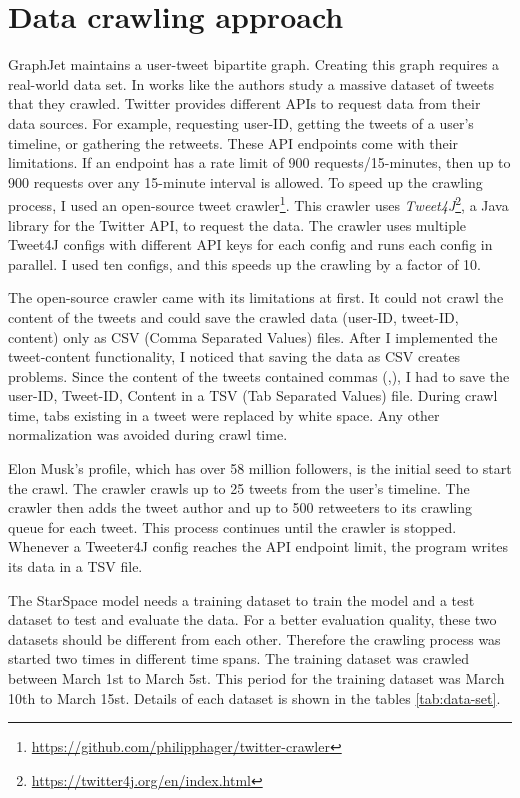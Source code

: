 \section{Data crawling approach}
\label{sec:data-crawling-approach}

GraphJet maintains a user-tweet bipartite graph. Creating this graph requires a real-world data set. In works like \cite{kwakWhatTwitterSocial2010} the authors study a massive dataset of tweets that they crawled. Twitter provides different APIs to request data from their data sources. For example, requesting user-ID, getting the tweets of a user's timeline, or gathering the retweets. These API endpoints come with their limitations. If an endpoint has a rate limit of 900 requests/15-minutes, then up to 900 requests over any 15-minute interval is allowed. To speed up the crawling process, I used an open-source tweet crawler\footnote{\url{https://github.com/philipphager/twitter-crawler}}. This crawler uses \emph{Tweet4J}\footnote{\url{https://twitter4j.org/en/index.html}}, a Java library for the Twitter API, to request the data. The crawler uses multiple Tweet4J configs with different API keys for each config and runs each config in parallel. I used ten configs, and this speeds up the crawling by a factor of 10. 


The open-source crawler came with its limitations at first. It could not crawl the content of the tweets and could save the crawled data (user-ID, tweet-ID, content) only as CSV (Comma Separated Values) files. After I implemented the tweet-content functionality, I noticed that saving the data as CSV creates problems. Since the content of the tweets contained commas (,), I had to save the user-ID, Tweet-ID, Content in a TSV (Tab Separated Values) file. During crawl time, tabs existing in a tweet were replaced by white space. Any other normalization was avoided during crawl time.


Elon Musk's profile, which has over 58 million followers, is the initial seed to start the crawl. The crawler crawls up to 25 tweets from the user's timeline. The crawler then adds the tweet author and up to 500 retweeters to its crawling queue for each tweet. This process continues until the crawler is stopped. Whenever a Tweeter4J config reaches the API endpoint limit, the program writes its data in a TSV file.


The StarSpace model needs a training dataset to train the model and a test dataset to test and evaluate the data. For a better evaluation quality, these two datasets should be different from each other. Therefore the crawling process was started two times in different time spans. The training dataset was crawled between March 1st to March 5st. This period for the training dataset was March 10th to March 15st. Details of each dataset is shown in the tables \ref{tab:data-set}.


